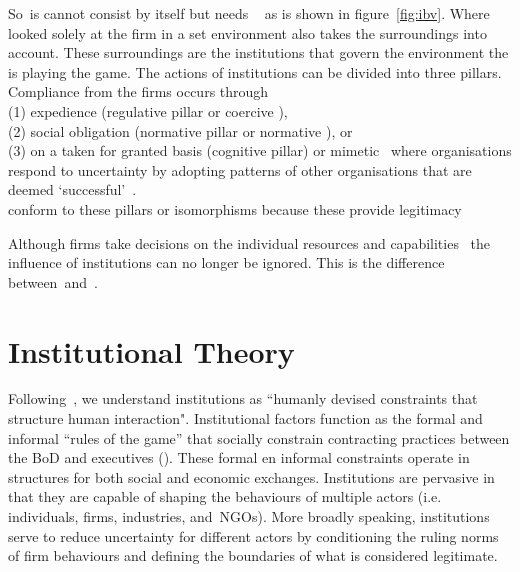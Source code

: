 So~\ibv is cannot consist by itself but needs \rbv ~\cite{Barney:1991, Porter:1980} as is shown in figure~\ref{fig:ibv}. 
Where \rbv looked solely at the firm in a set environment \ibv also takes the surroundings into account. These surroundings are the institutions that govern the environment the \mne is playing the game. 
The actions of institutions can be divided into three pillars. Compliance from the firms occurs through \\(1) expedience (regulative pillar or coercive \iso),\\
 (2) social obligation (normative pillar or normative \iso), or \\
 (3) on a taken for granted basis (cognitive pillar) or mimetic \iso~where organisations respond to uncertainty by adopting patterns of other organisations that are deemed `successful'~\cite{Westney:2005,Peng:2008,Kostova:1999,DiMaggio:1983,Scott:1995}.\\ 
\mne conform to these pillars or isomorphisms because these provide legitimacy~\cite{Powell:1991}

Although firms take decisions on the individual resources and capabilities~\cite{Barney:1991} the influence of institutions can no longer be ignored. This is the difference between~\rbv and~\ibv. 







\section{Institutional Theory}


Following~\cite{North:1990}, we understand institutions as ``humanly devised constraints that structure human interaction". Institutional factors function as the formal and informal ``rules of the game'' that socially constrain contracting practices between the \gls{BoD} and executives (\cite{North:1990}).  %
These formal en informal constraints operate in structures for both social and economic exchanges. 
Institutions are pervasive in that they are capable of shaping the behaviours of multiple actors (i.e. 
individuals, firms, industries, and~\glspl{NGO}). More broadly speaking, institutions serve to reduce 
uncertainty for different actors by conditioning the ruling norms of firm behaviours and defining the 
boundaries of what is considered legitimate.~\cite{Peng:2008}\\



